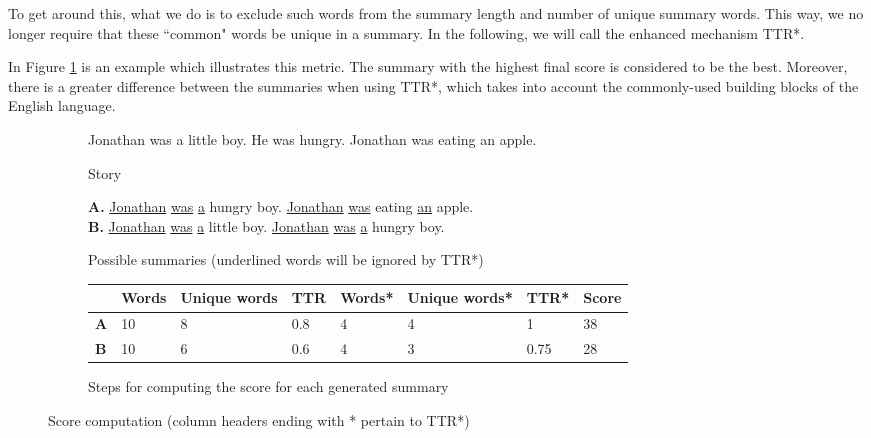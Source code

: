 To get around this, what we do is to exclude such words from the summary length and number of unique summary words. This way, we no longer require that these ``common" words be unique in a summary. In the following, we will call the enhanced mechanism \textsc{TTR*}.

In Figure \ref{fig:score_example} is an example which illustrates this metric. The summary with the highest final score is considered to be the best. Moreover, there is a greater difference between the summaries when using \textsc{TTR*}, which takes into account the commonly-used building blocks of the English language.

\begin{figure}[H]
\begin{subfigure}{\textwidth}
\begin{displayquote}
Jonathan was a little boy. He was hungry. Jonathan was eating an apple.
\end{displayquote}
\caption{Story}
\vspace{\baselineskip}
\end{subfigure}
\begin{subfigure}{\textwidth}
\begin{displayquote}
\textbf{A.} \underline{Jonathan} \underline{was} \underline{a} hungry boy. \underline{Jonathan} \underline{was} eating \underline{an} apple.\\
\textbf{B.} \underline{Jonathan} \underline{was} \underline{a} little boy. \underline{Jonathan} \underline{was} \underline{a} hungry boy.
\end{displayquote}
\caption{Possible summaries (underlined words will be ignored by \textsc{TTR*})}
\vspace{\baselineskip}
\end{subfigure}
\begin{subfigure}{\textwidth}
\centering
\begin{tabular}{@{}llllllll@{}}
\toprule
 & Words & Unique words & TTR & Words* & Unique words* & \textsc{TTR*} & Score \\ \midrule
\textbf{A} & 10    & 8            & 0.8 & 4      & 4             & 1    & 38    \\
\textbf{B} & 10    & 6            & 0.6 & 4      & 3             & 0.75 & 28    \\ \bottomrule
\end{tabular}
\caption{Steps for computing the score for each generated summary}
\end{subfigure}
\caption{Score computation (column headers ending with * pertain to \textsc{TTR*})}
\label{fig:score_example}
\end{figure}

